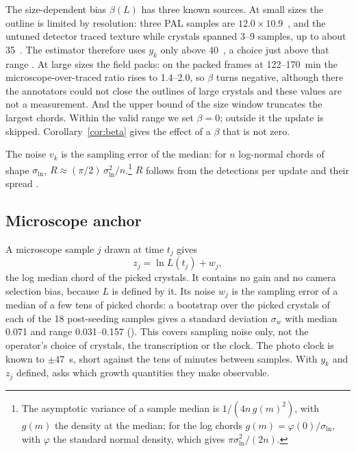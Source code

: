 The size-dependent bias $\beta(L)$ has three known sources. At small sizes the outline is limited by resolution:
three PAL samples are $12.0 \times 10.9$~\um, and the untuned detector traced texture while crystals spanned 3--9
samples, up to about 35~\um. The estimator therefore uses $y_k$ only above 40~\um, a choice just above that range
. At large sizes the field packs: on the packed frames at
122--170~min the microscope-over-traced ratio rises to 1.4--2.0, so $\beta$ turns negative, although there the
annotators could not close the outlines of large crystals and these values are not a measurement. And the upper bound
of the size window truncates the largest chords. Within the valid range we set $\beta = 0$; outside it the update is
skipped. Corollary~\ref{cor:beta} gives the effect of a $\beta$ that is not zero.

The noise $v_k$ is the sampling error of the median: for $n$ log-normal chords of shape $\sigma_\mathrm{ln}$,
$R \approx (\pi/2)\,\sigma_\mathrm{ln}^2 / n$.\footnote{The asymptotic variance of a sample median is
$1/(4 n\, g(m)^2)$, with $g(m)$ the density at the median; for the log chords $g(m) = \varphi(0)/\sigma_\mathrm{ln}$,
with $\varphi$ the standard normal density, which gives $\pi \sigma_\mathrm{ln}^2 / (2n)$.} $R$ follows from the
detections per update and their spread .

\subsection{Microscope anchor}\label{sec:anchor}

A microscope sample $j$ drawn at time $t_j$ gives
\begin{equation}\label{eq:anchor}
z_j = \ln L(t_j) + w_j,
\end{equation}
the log median chord of the picked crystals. It contains no gain and no camera selection bias, because $L$ is defined
by it. Its noise $w_j$ is the sampling error of a median of a few tens of picked chords: a bootstrap over the picked
crystals of each of the 18 post-seeding samples gives a standard deviation $\sigma_w$ with median 0.071 and range
0.031--0.157 (). This covers sampling noise only, not the operator's choice of
crystals, the transcription or the clock. The photo clock is known to $\pm 47$~s, short against the tens of
minutes between samples. With $y_k$ and $z_j$ defined,  asks which growth quantities they make
observable.

